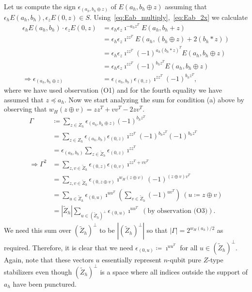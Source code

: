 \documentclass[twoside,romanappendices]{IEEEtran}
\begin{document}
Let us compute the sign $\epsilon_{(a_h, b_h \oplus z)}$ of $E(a_h, b_h \oplus z)$ assuming that $\epsilon_h E(a_h, b_h), \epsilon_z E(0,z) \in S$.
Using~\eqref{eq:Eab_multiply},~\eqref{eq:Eab_2x} we calculate
\begin{align}
\epsilon_h E(a_h, b_h) \cdot \epsilon_z E(0,z) & = \epsilon_h \epsilon_z \imath^{-a_h z^T} E(a_h, b_h + z) \\
%
   & = \epsilon_h \epsilon_z \imath^{zz^T} E(a_h, (b_h \oplus z) + 2 (b_h \ast z)) \\
   & = \epsilon_h \epsilon_z \imath^{zz^T} (-1)^{a_h (b_h \ast z)^T} E(a_h, b_h \oplus z) \\
   & = \epsilon_h \epsilon_z \imath^{zz^T} (-1)^{b_h z^T} E(a_h, b_h \oplus z) \\
\Rightarrow \epsilon_{(a_h, b_h \oplus z)} & = \epsilon_{(a_h, b_h)} \epsilon_{(0,z)} \imath^{zz^T} (-1)^{b_h z^T},
\end{align}
where we have used observation (O1) and for the fourth equality we have assumed that $z \preceq a_h$.
Now we start analyzing the sum for condition (a) above by observing that $w_H(z \oplus v) = zz^T + vv^T - 2zv^T$.
\begin{align}
\Gamma & \coloneqq \sum_{z \in Z_h} \epsilon_{(a_h, b_h \oplus z)} (-1)^{b_h z^T} \\
%
   & = \sum_{z \in Z_h} \epsilon_{(a_h, b_h)} \epsilon_{(0,z)} \imath^{zz^T} (-1)^{b_h z^T} (-1)^{b_h z^T} \\
   & = \epsilon_{(a_h, b_h)} \sum_{z \in \tilde{Z}_h} \epsilon_{(0,z)} \imath^{zz^T} \\
%
\Rightarrow \Gamma^2 & = \sum_{z,v \in \tilde{Z}_h} \epsilon_{(0,z)} \epsilon_{(0,v)} \imath^{zz^T + vv^T} \\
%
   & = \sum_{z,v \in \tilde{Z}_h} \epsilon_{(0,z \oplus v)} \imath^{w_H(z \oplus v)} (-1)^{(z \oplus v) v^T} \\
   & = \sum_{u \in \tilde{Z}_h} \epsilon_{(0,u)} \imath^{uu^T} \left( \sum_{v \in \tilde{Z}_h} (-1)^{uv^T} \right)\ (u \coloneqq z \oplus v) \\
   & = |\tilde{Z}_h| \sum_{u \in (\tilde{Z}_h)^{\perp}} \epsilon_{(0,u)} \imath^{uu^T}\ (\text{by\ observation\ (O3)}).
\end{align}
We need this sum over $(\tilde{Z}_h)^{\perp}$ to be $|(\tilde{Z}_h)^{\perp}|$ so that $|\Gamma| = 2^{w_H(a_h)/2}$ as required.
Therefore, it is clear that we need $\epsilon_{(0,u)} \coloneqq \imath^{uu^T}$ for all $u \in (\tilde{Z}_h)^{\perp}$.
Again, note that these vectors $u$ essentially represent $n$-qubit pure $Z$-type stabilizers even though $(\tilde{Z}_h)^{\perp}$ is a space where all indices outside the support of $a_h$ have been punctured.
\end{document}
